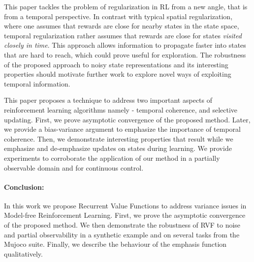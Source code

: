 This paper tackles the problem of regularization in RL from a new angle, that is from a temporal perspective. In contrast with typical spatial regularization, where one assumes that rewards are close for nearby states in the state space, temporal regularization rather assumes that rewards are close for states \emph{visited closely in time}. This approach allows information to propagate faster into states that are hard to reach, which could prove useful for exploration. The robustness of the proposed approach to noisy state representations and its interesting properties should motivate further work to explore novel ways of exploiting temporal information.

This paper proposes a technique to address two important aspects of reinforcement learning algorithms namely - temporal coherence, and selective updating. First, we prove asymptotic convergence of the proposed method. Later, we provide a bias-variance argument to emphasize the importance of temporal coherence. Then, we demonstrate interesting properties that result while we emphasize and de-emphasize updates on states during learning. We provide experiments to corroborate the application of our method in a partially observable domain and for continuous control.

\paragraph{Conclusion:} In this work we propose Recurrent Value Functions to address variance issues in Model-free Reinforcement Learning. First, we prove the asymptotic convergence of the proposed method. We then demonstrate the robustness of RVF to noise and partial observability in a synthetic example and on several tasks from the Mujoco suite. Finally, we describe the behaviour of the emphasis function qualitatively.